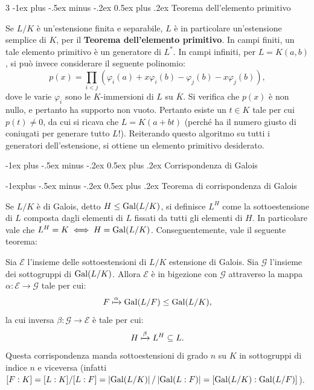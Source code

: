 \documentclass[10pt,landscape]{article}
\makeatletter
\renewcommand{\section}{\@startsection{section}{1}{0mm}%
	{-1ex plus -.5ex minus -.2ex}%
	{0.5ex plus .2ex}%
	{\normalfont\large\bfseries}}
\renewcommand{\subsection}{\@startsection{subsection}{2}{0mm}%
	{-1explus -.5ex minus -.2ex}%
	{0.5ex plus .2ex}%
	{\normalfont\normalsize\bfseries}}
\makeatother
\begin{document}
\begin{multicols}{3}
	\section{Teorema dell'elemento primitivo}

	Se $L / K$ è un'estensione finita e separabile,
	$L$ è in particolare un'estensione semplice di
	$K$, per il \textbf{Teorema dell'elemento primitivo}.
	In campi finiti, un tale elemento primitivo è
	un generatore di $L^*$. In campi infiniti, per
	$L = K(a, b)$,
	si può invece considerare il seguente polinomio:
	\[ p(x) = \prod_{i < j} (\varphi_i(a) + x \varphi_i(b) - \varphi_j(b) - x \varphi_j(b)), \]
	dove le varie $\varphi_i$ sono le $K$-immersioni di
	$L$ su $\overline{K}$.
	Si verifica che $p(x)$ è non nullo, e pertanto
	ha supporto non vuoto. Pertanto esiste un $t \in K$ tale
	per cui $p(t) \neq 0$, da cui si ricava che
	$L = K(a + bt)$ (perché ha il numero giusto di coniugati per
	generare tutto $L$!). Reiterando questo algoritmo su
	tutti i generatori dell'estensione, si ottiene
	un elemento primitivo desiderato.

	\section{Corrispondenza di Galois}

	\subsection{Teorema di corrispondenza di Galois}

	Se $L / K$ è di Galois, detto $H \leq \operatorname{Gal}(L / K)$,
	si definisce $L^H$ come la sottoestensione di $L$ composta
	dagli elementi di $L$
	fissati da tutti gli elementi di $H$.
	In particolare vale che $L^H = K \iff H = \operatorname{Gal}(L / K)$.
	Conseguentemente, vale il seguente teorema:

	\begin{theorem}
		Sia $\mathcal{E}$ l'insieme delle sottoestensioni
		di $L / K$ estensione di Galois. Sia
		$\mathcal{G}$ l'insieme dei sottogruppi di
		$\operatorname{Gal}(L / K)$. Allora $\mathcal{E}$ è
		in bigezione con $\mathcal{G}$ attraverso
		la mappa $\alpha : \mathcal{E} \to \mathcal{G}$
		tale per cui:
		\[ F \xmapsto{\alpha} \operatorname{Gal}(L / F) \leq
			\operatorname{Gal}(L / K), \]
		la cui inversa $\beta : \mathcal{G} \to \mathcal{E}$
		è tale per cui:
		\[ H \xmapsto{\beta} L^H \subseteq L. \]
		Questa corrispondenza manda sottoestensioni di grado $n$ su $K$
		in sottogruppi di indice $n$ e viceversa (infatti $[F : K] = [L : K] / [L : F] = \left\lvert \operatorname{Gal}(L / K) \right\rvert / \left\lvert \operatorname{Gal}(L : F) \right\rvert =
			[\operatorname{Gal}(L / K) : \operatorname{Gal}(L / F)]$). \smallskip


\end{theorem}
\end{multicols}
\end{document}
